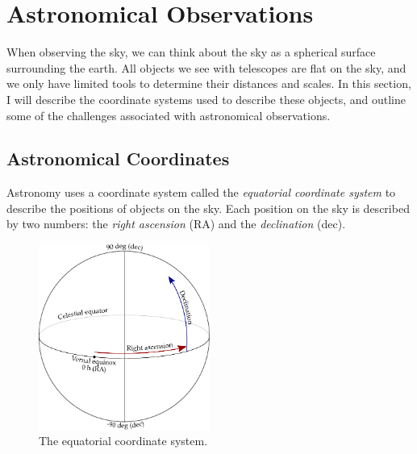 
    \section{Astronomical Observations}

        When observing the sky, we can think about the sky as a spherical surface surrounding the earth. All objects we see with telescopes are flat on the sky, and we only have limited tools to determine their distances and scales. In this section, I will describe the coordinate systems used to describe these objects, and outline some of the challenges associated with astronomical observations.

        \subsection{Astronomical Coordinates}

            Astronomy uses a coordinate system called the \emph{equatorial coordinate system} to describe the positions of objects on the sky. Each position on the sky is described by two numbers: the \emph{right ascension} (RA) and the \emph{declination} (dec).

            \begin{figure}[!ht]
                \centering
                \includegraphics[width=0.5\textwidth]{images/ra-dec}
                \caption{The equatorial coordinate system.}
                \label{fig:equatorial-coordinates}
            \end{figure}

